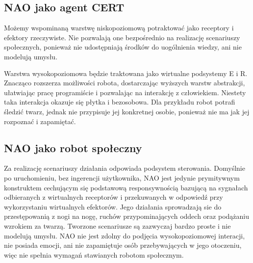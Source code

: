 \subsection{NAO jako agent CERT}

Możemy wspominaną warstwę niskopoziomową potraktować jako receptory i efektory rzeczywiste. Nie pozwalają one bezpośrednio na realizację scenariuszy społecznych, ponieważ nie udostępniają środków do uogólnienia wiedzy, ani nie modelują umysłu. 

Warstwa wysokopoziomowa będzie traktowana jako wirtualne podsystemy E i R. Znacząco rozszerza możliwości robota, dostarczając wyższych warstw abstrakcji, ułatwiając pracę programiście i pozwalając na interakcję z człowiekiem. Niestety taka interakcja okazuje się płytka i bezosobowa. Dla przykładu robot potrafi śledzić twarz, jednak nie przypisuje jej konkretnej osobie, ponieważ nie ma jak jej rozpoznać i zapamiętać.

\subsection{NAO jako robot społeczny}

Za realizację scenariuszy działania odpowiada podsystem sterowania. Domyślnie po uruchomieniu, bez ingerencji użytkownika, NAO jest jedynie prymitywnym konstruktem cechującym się podstawową responsywnością bazującą na sygnałach odbieranych z wirtualnych receptorów i przekuwanych w odpowiedź przy wykorzystaniu wirtualnych efektorów. Jego działania sprowadzają sie do przestępowanią z nogi na nogę, ruchów przypominających oddech oraz podążaniu wzrokiem za twarzą. Tworzone scenariusze są zazwyczaj bardzo proste i nie modelują umysłu. NAO nie jest zdolny do podjęcia wysokopoziomowej interacji, nie posiada emocji, ani nie zapamiętuje osób przebywających w jego otoczeniu, więc nie spełnia wymagań stawianych robotom społecznym.

